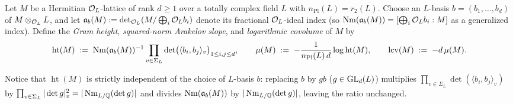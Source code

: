 \begin{definition}
\label{def:05:squared-slope}
Let $M$ be a Hermitian $\mathcal{O}_L$-lattice of rank $d \ge 1$ over a totally complex field $L$ with $n_{\mathrm{Pl}}(L) = r_2(L)$. Choose an $L$-basis $b = (b_1, \dots, b_d)$ of $M \otimes_{\mathcal{O}_L} L$, and let $\mathfrak{a}_b(M) := \det_{\mathcal{O}_L}(M / \bigoplus_i \mathcal{O}_L b_i)$ denote its fractional $\mathcal{O}_L$-ideal index (so $\operatorname{Nm}(\mathfrak{a}_b(M)) = [\bigoplus_i \mathcal{O}_L b_i : M]$ as a generalized index). Define the \emph{Gram height}, \emph{squared-norm Arakelov slope}, and \emph{logarithmic covolume} of $M$ by
\begin{equation}
\label{eq:05:mu-def}
  \operatorname{ht}(M) \;:=\; \operatorname{Nm}(\mathfrak{a}_b(M))^{-1} \prod_{v \in \Sigma_L} \det\bigl(\langle b_i, b_j \rangle_v\bigr)_{1 \le i,j \le d},
  \qquad
  \mu(M) \;:=\; -\frac{1}{n_{\mathrm{Pl}}(L)\, d}\log \operatorname{ht}(M),
  \qquad
  \operatorname{lcv}(M) \;:=\; -d\,\mu(M).
\end{equation}
\end{definition}

Notice that $\operatorname{ht}(M)$ is strictly independent of the choice of $L$-basis $b$: replacing $b$ by $g b$ ($g \in \mathrm{GL}_d(L)$) multiplies $\prod_{v \in \Sigma_L} \det(\langle b_i, b_j \rangle_v)$ by $\prod_{v \in \Sigma_L} |\det g|_v^2 = |\operatorname{Nm}_{L/\mathbb{Q}}(\det g)|$ and divides $\operatorname{Nm}(\mathfrak{a}_b(M))$ by $|\operatorname{Nm}_{L/\mathbb{Q}}(\det g)|$, leaving the ratio unchanged.

